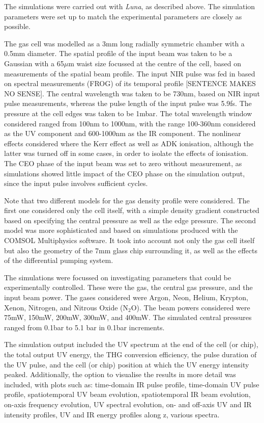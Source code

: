 \documentclass[a4paper]{jpconf}
\begin{document}
The simulations were carried out with \emph{Luna}, as described above. The simulation parameters were set up to match the experimental parameters are closely as possible. \par 
 The gas cell was modelled as a 3mm long radially symmetric chamber with a 0.5mm diameter. The spatial profile of the input beam was taken to be a Gaussian with a 65$\mu$m waist size focussed at the centre of the cell, based on measurements of the spatial beam profile. The input NIR pulse was fed in based on spectral measurements (FROG) of its temporal profile [SENTENCE MAKES NO SENSE]. The central wavelength was taken to be 730nm, based on NIR input pulse measurements, whereas the pulse length of the input pulse was 5.9fs. The pressure at the cell edges was taken to be 1mbar. The total wavelength window considered ranged from 100nm to 1000nm, with the range 100-360nm considered as the UV component and 600-1000nm as the IR component. The nonlinear effects considered where the Kerr effect as well as ADK ionisation, although the latter was turned off in some cases, in order to isolate the effects of ionisation. The CEO phase of the input beam was set to zero without measurement, as simulations showed little impact of the CEO phase on the simulation output, since the input pulse involves sufficient cycles. \par 
Note that two different models for the gas density profile were considered. The first one considered only the cell itself, with a simple density gradient constructed based on specifying the central pressure as well as the edge pressure. The second model was more sophisticated and based on simulations produced with the COMSOL Multiphysics software. It took into account not only the gas cell itself but also the geometry of the 7mm glass chip surrounding it, as well as the effects of the differential pumping system. \par 
The simulations were focussed on investigating parameters that could be experimentally controlled. These were the gas, the central gas pressure, and the input beam power. The gases considered were Argon, Neon, Helium, Krypton, Xenon, Nitrogen, and Nitrous Oxide (N$_2$O). The beam powers considered were 75mW, 150mW, 200mW, 300mW, and 400mW. The simulated central pressures ranged from 0.1bar to 5.1 bar in 0.1bar increments. \par 
The simulation output included the UV spectrum at the end of the cell (or chip), the total output UV energy, the THG conversion efficiency, the pulse duration of the UV pulse, and the cell (or chip) position at which the UV energy intensity peaked. Additionally, the option to visualise the results in more detail was included, with plots such as: time-domain IR pulse profile, time-domain UV pulse profile, spatiotemporal UV beam evolution, spatiotemporal IR beam evolution, on-axis frequency evolution, UV spectral evolution, on- and off-axis UV and IR intensity profiles, UV and IR energy profiles along z, various spectra. \par 
\end{document}
